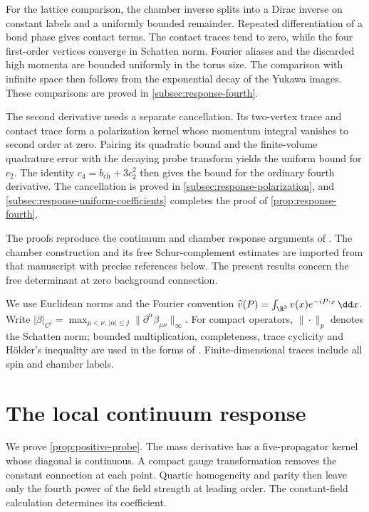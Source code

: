 \documentclass[11pt,letterpaper,reqno]{amsart}
\begin{document}
For the lattice comparison, the chamber inverse splits into a
Dirac inverse on constant labels and a uniformly bounded remainder.
Repeated differentiation of a bond phase gives contact terms.
The contact traces tend to zero, while the four first-order
vertices converge in Schatten norm. Fourier aliases and the
discarded high momenta are bounded uniformly in the torus size.
The comparison with infinite space then follows from the
exponential decay of the Yukawa images. These comparisons are
proved in \cref{subsec:response-fourth}.

The second derivative needs a separate cancellation. Its
two-vertex trace and contact trace form a polarization kernel whose
momentum integral vanishes to second order at zero. Pairing its
quadratic bound and the finite-volume quadrature error with the
decaying probe transform yields the uniform bound for $c_2$.
The identity $c_4=b_{\mathrm{ch}}+3c_2^2$ then gives the bound
for the ordinary fourth derivative. The cancellation is proved in
\cref{subsec:response-polarization}, and
\cref{subsec:response-uniform-coefficients} completes the proof of
\cref{prop:response-fourth}.

The proofs reproduce the continuum and chamber response arguments
of \cite[\S17--18]{QED3Master}. The chamber construction and its
free Schur-complement estimates are imported from that manuscript
with precise references below. The present results concern the
free determinant at zero background connection.

We use Euclidean norms and the Fourier convention
$\widehat v(P)=\int_{\R^3}v(x)e^{-iP\cdot x}\,\dd x$.
Write
$|\beta|_{C^j}=\max_{\mu<\nu,\,|\alpha|\le j}
\|\partial^\alpha\beta_{\mu\nu}\|_\infty$.
For compact operators, $\|\cdot\|_p$ denotes the Schatten norm;
bounded multiplication, completeness, trace cyclicity and
H\"older's inequality are used in the forms of
\cite[slides~16, 53--56]{PongeSchatten2025}.
Finite-dimensional traces include all spin and chamber labels.
\section{The local continuum response}\label{sec:positive-probe}

We prove \cref{prop:positive-probe}. The mass derivative has a
five-propagator kernel whose diagonal is continuous. A compact gauge
transformation removes the constant connection at each point.
Quartic homogeneity and parity then leave only the fourth power of
the field strength at leading order. The constant-field calculation
determines its coefficient.
\end{document}
